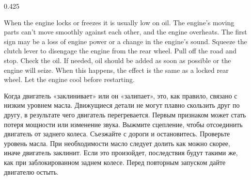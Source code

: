 \begin{langblock}{0.425}
	\begin{eng}
	
	When the engine locks or freezes it is usually low on oil. The engine's moving parts can't move smoothly against each other, and the engine overheats. The first sign may be a loss of engine power or a change in the engine's sound. Squeeze the clutch lever to disengage the engine from the rear wheel. Pull off the road and stop. Check the oil. If needed, oil should be added as soon as possible or the engine will seize. When this happens, the effect is the same as a locked rear wheel. Let the engine cool before restarting.
	\end{eng}
	\begin{rus}
		
		Когда двигатель «заклинивает» или он «залипает», это, как правило, связано с низким уровнем масла. Движущиеся детали не могут плавно скользить друг по другу, в результате чего двигатель перегревается. Первым признаком может стать потеря мощности или изменение звука. Выжмите сцепление, чтобы отсоединить двигатель от заднего колеса. Съезжайте с дороги и остановитесь. Проверьте уровень масла. При необходимости масло следует долить как можно скорее, иначе двигатель заклинит. Если это произойдет, последствия будут такими же, как при заблокированном заднем колесе. Перед повторным запуском дайте двигателю остыть.
\end{rus}
\end{langblock}




